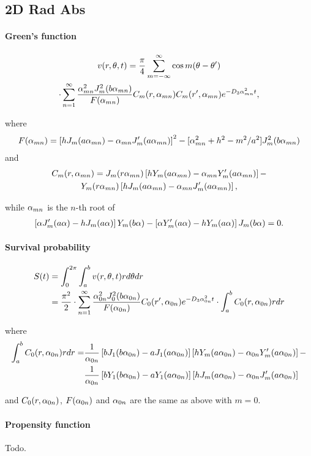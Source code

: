 \subsection{2D Rad Abs}

\paragraph{Green's function}
\begin{multline}
  v(r,\theta, t) = \frac{\pi}{4} \sum_{m=-\infty}^{\infty} \cos m(\theta-\theta') \\
  \cdot \sum_{n=1}^{\infty} \frac{\alpha_{mn}^2 J_m^2(b\alpha_{mn})}{F(\alpha_{mn})} 
  C_m(r,\alpha_{mn})C_m(r',\alpha_{mn})e^{-D_3\alpha_{mn}^2t},
\end{multline}

where
\begin{align}
  F(\alpha_{mn}) = \left[hJ_m(a\alpha_{mn}) - \alpha_{mn} J_m'(a\alpha_{mn})\right]^2
  -[\alpha_{mn}^2+h^2-m^2/a^2]J_m^2(b\alpha_{mn})
\end{align}
and
\begin{multline}
  C_m(r,\alpha_{mn}) = J_m(r\alpha_{mn})\left[hY_m(a\alpha_{mn})-\alpha_{mn} Y_m'(a\alpha_{mn})\right]-\\
  Y_m(r\alpha_{mn})\left[hJ_m(a\alpha_{mn})-\alpha_{mn} J_m'(a\alpha_{mn})\right],
\end{multline}

while $\alpha_{mn}$ is the $n$-th root of
\begin{align}
 \left[\alpha J_m'(a\alpha)-hJ_m(a\alpha)\right]Y_m(b\alpha) -
 \left[\alpha Y_m'(a\alpha)-hY_m(a\alpha)\right]J_m(b\alpha) = 0.
\end{align}



\paragraph{Survival probability}
\begin{align}
  S(t) &= \int_0^{2\pi}\int_a^bv(r,\theta,t)rd\theta dr\notag\\
  &= \frac{\pi^2}{2} \cdot \sum_{n=1}^{\infty}
  \frac{\alpha_{0n}^2 J_0^2(b\alpha_{0n})}{F(\alpha_{0n})}
  C_0(r',\alpha_{0n})e^{-D_3\alpha_{0n}^2t} \cdot \int_a^bC_0(r,\alpha_{0n})r dr
\end{align}

where
\begin{align}
  \int_a^bC_0(r,\alpha_{0n})r dr = &\frac{1}{\alpha_{0n}}\left[bJ_1(b\alpha_{0n}) - 
  aJ_1(a\alpha_{0n})\right] \left[hY_m(a\alpha_{0n})-\alpha_{0n} Y_m'(a\alpha_{0n})\right]-\\
  &\frac{1}{\alpha_{0n}}\left[bY_1(b\alpha_{0n}) - aY_1(a\alpha_{0n})\right] \left[hJ_m(a\alpha_{0n})-\alpha_{0n} 
  J_m'(a\alpha_{0n})\right]
\end{align}

and $C_0(r,\alpha_{0n})$, $F(\alpha_{0n})$ and $\alpha_{0n}$ are the same as above with $m=0$.

\paragraph{Propensity function}
Todo.






